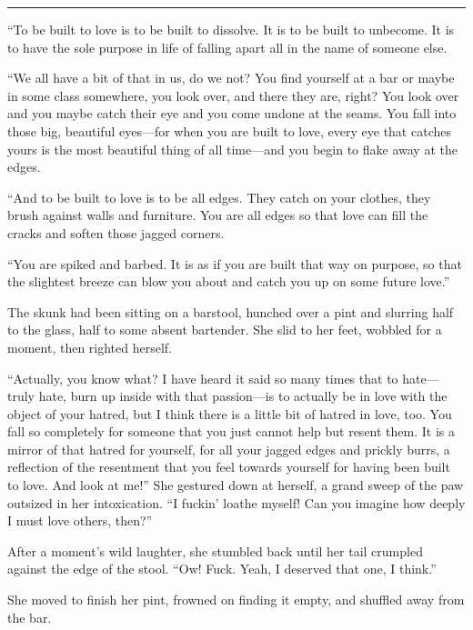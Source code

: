 \begin{center}\rule{0.5\linewidth}{0.5pt}\end{center}

``To be built to love is to be built to dissolve. It is to be built to unbecome. It is to have the sole purpose in life of falling apart all in the name of someone else.

``We all have a bit of that in us, do we not? You find yourself at a bar or maybe in some class somewhere, you look over, and there they are, right? You look over and you maybe catch their eye and you come undone at the seams. You fall into those big, beautiful eyes—for when you are built to love, every eye that catches yours is the most beautiful thing of all time—and you begin to flake away at the edges.

``And to be built to love is to be all edges. They catch on your clothes, they brush against walls and furniture. You are all edges so that love can fill the cracks and soften those jagged corners.

``You are spiked and barbed. It is as if you are built that way on purpose, so that the slightest breeze can blow you about and catch you up on some future love.''


The skunk had been sitting on a barstool, hunched over a pint and slurring half to the glass, half to some absent bartender. She slid to her feet, wobbled for a moment, then righted herself.

``Actually, you know what? I have heard it said so many times that to hate—truly hate, burn up inside with that passion—is to actually be in love with the object of your hatred, but I think there is a little bit of hatred in love, too. You fall so completely for someone that you just cannot help but resent them. It is a mirror of that hatred for yourself, for all your jagged edges and prickly burrs, a reflection of the resentment that you feel towards yourself for having been built to love. And look at me!'' She gestured down at herself, a grand sweep of the paw outsized in her intoxication. ``I fuckin' loathe myself! Can you imagine how deeply I must love others, then?''

After a moment's wild laughter, she stumbled back until her tail crumpled against the edge of the stool. ``Ow! Fuck. Yeah, I deserved that one, I think.''

She moved to finish her pint, frowned on finding it empty, and shuffled away from the bar.

